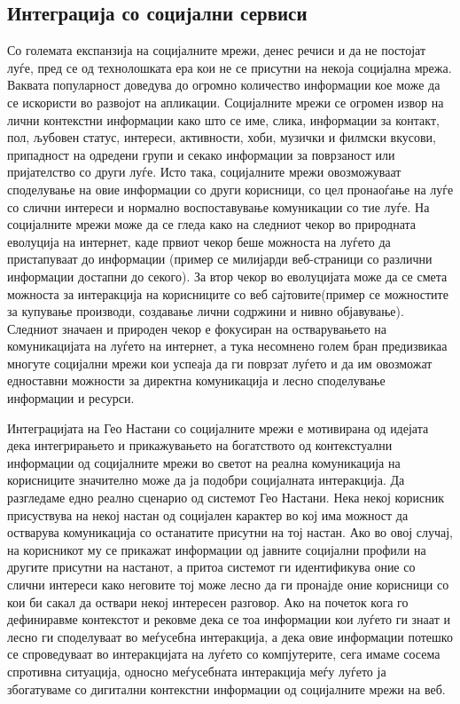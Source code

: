 \subsection{Интеграција со социјални сервиси}

Со големата експанзија на социјалните мрежи, денес речиси и да не постојат луѓе,
пред се од технолошката ера кои не се присутни на некоја социјална мрежа.
Ваквата популарност доведува до огромно количество информации кое може да се
искористи во развојот на апликации. Социјалните мрежи се огромен извор на лични
контекстни информации како што се име, слика, информации за контакт, пол,
љубовен статус, интереси, активности, хоби, музички и филмски вкусови,
припадност на одредени групи и секако информации за поврзаност или пријателство
со други луѓе. Исто така, социјалните мрежи овозможуваат споделување на овие
информации со други корисници, со цел пронаоѓање на луѓе со слични интереси и
нормално воспоставување комуникации со тие луѓе. На социјалните мрежи може да се
гледа како на следниот чекор во природната еволуција на интернет, каде првиот
чекор беше можноста на луѓето да пристапуваат до информации (пример се милијарди
веб-страници со различни информации достапни до секого). За втор чекор во
еволуцијата може да се смета можноста за интеракција на корисниците со веб
сајтовите(пример се можностите за купување производи, создавање лични содржини и
нивно објавување). Следниот значаен и природен чекор е фокусиран на
остварувањето на комуникацијата на луѓето на интернет, а тука несомнено голем
бран предизвикаа многуте социјални мрежи кои успеаја да ги поврзат луѓето и да
им овозможат едноставни можности за директна комуникација и лесно споделување
информации и ресурси.

Интеграцијата на Гео Настани со социјалните мрежи е мотивирана од идејата дека
интегрирањето и прикажувањето на богатството од контекстуални информации од социјалните мрежи во
светот на реална комуникација на корисниците значително може да ја подобри
социјалната интеракција. Да разгледаме едно реално сценарио од системот Гео
Настани. Нека некој корисник присуствува на некој настан од социјален карактер
во кој има можност да остварува комуникација со останатите присутни на тој
настан. Ако во овој случај, на корисникот му се прикажат информации од јавните
социјални профили на другите присутни на настанот, а притоа системот ги
идентификува оние со слични интереси како неговите тој може лесно да ги пронајде
оние корисници со кои би сакал да оствари некој интересен разговор. Ако на
почеток кога го дефиниравме контекстот и рековме дека се тоа информации кои
луѓето ги знаат и лесно ги споделуваат во меѓусебна интеракција, а дека овие
информации потешко се спроведуваат во интеракцијата на луѓето со компјутерите,
сега имаме сосема спротивна ситуација, односно меѓусебната интеракција меѓу
луѓето ја збогатуваме со дигитални контекстни информации од социјалните мрежи на
веб.


